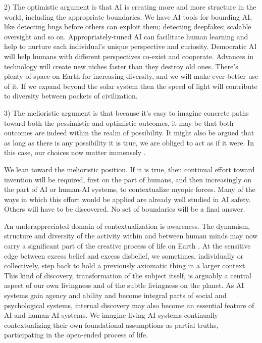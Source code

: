\documentclass[12pt]{article}
\begin{document}
2) The optimistic argument is that AI is creating more and more structure in the world, including the appropriate boundaries. We have AI tools for bounding AI, like detecting bugs before others can exploit them; detecting deepfakes; scalable oversight and so on. Appropriately-tuned AI can facilitate human learning and help to nurture each individual's unique perspective and curiosity. Democratic AI will help humans with different perspectives co-exist and cooperate. Advances in technology will create new niches faster than they destroy old ones. There's plenty of space on Earth for increasing diversity, and we will make ever-better use of it. If we expand beyond the solar system then the speed of light will contribute to diversity between pockets of civilization.

3) The melioristic argument is that because it's easy to imagine concrete paths toward both the pessimistic and optimistic outcomes, it may be that both outcomes are indeed within the realm of possibility. It might also be argued that as long as there is any possibility it is true, we are obliged to act as if it were. In this case, our choices now matter immensely \citep{ord2020precipice}. 

We lean toward the melioristic position. If it is true, then continual effort toward invention will be required, first on the part of humans, and then increasingly on the part of AI or human-AI systems, to contextualize myopic forces. Many of the ways in which this effort would be applied are already well studied in AI safety. Others will have to be discovered. No set of boundaries will be a final answer. 

An underappreciated domain of contextualization is awareness. The dynamism, structure and diversity of the activity within and between human minds may now carry a significant part of the creative process of life on Earth \citep{popper1972objective, piaget1971biology, aurobindo2005lifedivine, bergson1911creative, boyd2013culturaltechnology}. At the sensitive edge between excess belief and excess disbelief, we sometimes, individually or collectively, step back to hold a previously axiomatic thing in a larger context. This kind of discovery, transformation of the subject itself, is arguably a central aspect of our own livingness and of the subtle livingness on the planet. As AI systems gain agency and ability and become integral parts of social and psychological systems, internal discovery may also become an essential feature of AI and human-AI systems. We imagine living AI systems continually contextualizing their own foundational assumptions as partial truths, participating in the open-ended process of life. 
\end{document}
